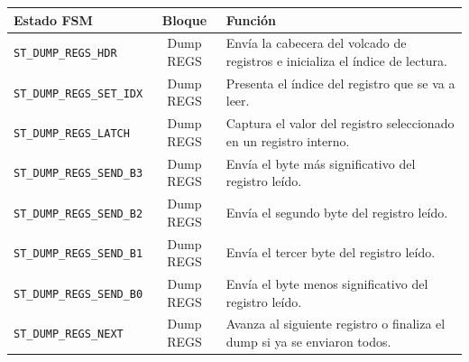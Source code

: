 \begin{center}
\begin{tabular}{|l|c|p{8.3cm}|}
\hline
\textbf{Estado FSM} & \textbf{Bloque} & \textbf{Función} \\ \hline
\texttt{ST\_DUMP\_REGS\_HDR} & Dump REGS & Envía la cabecera del volcado de registros e inicializa el índice de lectura. \\ \hline
\texttt{ST\_DUMP\_REGS\_SET\_IDX} & Dump REGS & Presenta el índice del registro que se va a leer. \\ \hline
\texttt{ST\_DUMP\_REGS\_LATCH} & Dump REGS & Captura el valor del registro seleccionado en un registro interno. \\ \hline
\texttt{ST\_DUMP\_REGS\_SEND\_B3} & Dump REGS & Envía el byte más significativo del registro leído. \\ \hline
\texttt{ST\_DUMP\_REGS\_SEND\_B2} & Dump REGS & Envía el segundo byte del registro leído. \\ \hline
\texttt{ST\_DUMP\_REGS\_SEND\_B1} & Dump REGS & Envía el tercer byte del registro leído. \\ \hline
\texttt{ST\_DUMP\_REGS\_SEND\_B0} & Dump REGS & Envía el byte menos significativo del registro leído. \\ \hline
\texttt{ST\_DUMP\_REGS\_NEXT} & Dump REGS & Avanza al siguiente registro o finaliza el dump si ya se enviaron todos. \\ \hline
\end{tabular}
\end{center}

\vspace{0.8em}

